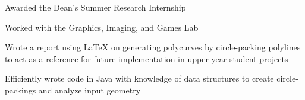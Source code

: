 \hbox{}

\begin{bullets}
    \item Awarded the Dean's Summer Research Internship
    \item Worked with the Graphics, Imaging, and Games Lab
    \item Wrote a report using \LaTeX\hbox{} on generating polycurves by circle-packing polylines to act as a reference for future implementation in upper year student projects
    \item Efficiently wrote code in Java with knowledge of data structures to create circle-packings and analyze input geometry
\end{bullets}


